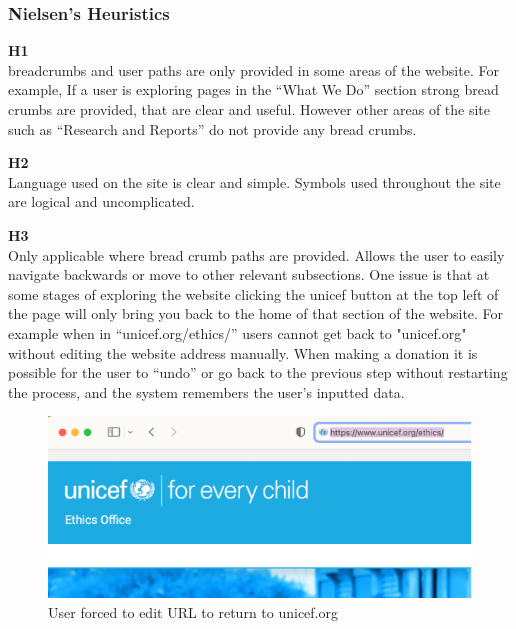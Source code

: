 \subsubsection{Nielsen's Heuristics}
\begin{description}
    \item {\textbf{H1} \color{unicefGray}{Visibility of the system status}}\\
    breadcrumbs and user paths are only provided in some areas of the website. For example, If a user is exploring pages in the “What We Do” section strong bread crumbs are provided, that are clear and useful. 
    However other areas of the site such as “Research and Reports” do not provide any bread crumbs.
    \item {\textbf{H2} \color{unicefGray}{Match between system and the real world}}\\
    Language used on the site is clear and simple. Symbols used throughout the site are logical and uncomplicated.    
    \item {\textbf{H3} \color{unicefGray}{User control and freedom}}\\
    Only applicable where bread crumb paths are provided. Allows the user to easily navigate backwards or move to other relevant subsections. 
    One issue is that at some stages of exploring the website clicking the unicef button at the top left of the page will only bring you back to the home of that section of the website. 
    For example when in “unicef.org/ethics/” users cannot get back to "unicef.org" without editing the website address manually.
    When making a donation it is possible for the user to “undo” or go back to the previous step without restarting the process, and the system remembers the user’s inputted data. 
    \begin{figure}[htp!]
        \centering
        \includegraphics[scale=0.8]{Resources/Harry/Harry_H3.png}
        \caption{User forced to edit URL to return to unicef.org}
    \end{figure}

\end{description}
